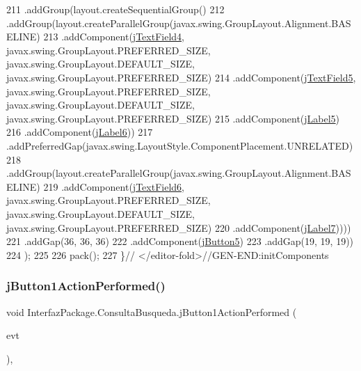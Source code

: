 \begin{DoxyCode}
211                     .addGroup(layout.createSequentialGroup()
212                         .addGroup(layout.createParallelGroup(javax.swing.GroupLayout.Alignment.BASELINE)
213                             .addComponent(\mbox{\hyperlink{class_interfaz_package_1_1_consulta_busqueda_a1955bd4179b98e109c23fb701af55b5d}{jTextField4}}, javax.swing.GroupLayout.PREFERRED\_SIZE, 
      javax.swing.GroupLayout.DEFAULT\_SIZE, javax.swing.GroupLayout.PREFERRED\_SIZE)
214                             .addComponent(\mbox{\hyperlink{class_interfaz_package_1_1_consulta_busqueda_a62b77207a9f1d648087f776c36b92c4a}{jTextField5}}, javax.swing.GroupLayout.PREFERRED\_SIZE, 
      javax.swing.GroupLayout.DEFAULT\_SIZE, javax.swing.GroupLayout.PREFERRED\_SIZE)
215                             .addComponent(\mbox{\hyperlink{class_interfaz_package_1_1_consulta_busqueda_aa93cd22be90131fea76b2a1b2f113b9b}{jLabel5}})
216                             .addComponent(\mbox{\hyperlink{class_interfaz_package_1_1_consulta_busqueda_ab5f2ed2b4cd6da7ed4e68ab08caabf65}{jLabel6}}))
217                         .addPreferredGap(javax.swing.LayoutStyle.ComponentPlacement.UNRELATED)
218                         .addGroup(layout.createParallelGroup(javax.swing.GroupLayout.Alignment.BASELINE)
219                             .addComponent(\mbox{\hyperlink{class_interfaz_package_1_1_consulta_busqueda_a98f9196a81f18bfd45672e1c4605d68a}{jTextField6}}, javax.swing.GroupLayout.PREFERRED\_SIZE, 
      javax.swing.GroupLayout.DEFAULT\_SIZE, javax.swing.GroupLayout.PREFERRED\_SIZE)
220                             .addComponent(\mbox{\hyperlink{class_interfaz_package_1_1_consulta_busqueda_a999fbcac6f0a6a7bfc57c17612ea2605}{jLabel7}}))))
221                 .addGap(36, 36, 36)
222                 .addComponent(\mbox{\hyperlink{class_interfaz_package_1_1_consulta_busqueda_a92a758e63cc825dd1292869d625115dd}{jButton5}})
223                 .addGap(19, 19, 19))
224         );
225 
226         pack();
227     \}\textcolor{comment}{// </editor-fold>//GEN-END:initComponents}
\end{DoxyCode}
\mbox{\label{class_interfaz_package_1_1_consulta_busqueda_ab7479eeeb30a47204e0ce5435b2943f4}} 
\subsubsection{\texorpdfstring{j\+Button1\+Action\+Performed()}{jButton1ActionPerformed()}}
{\footnotesize\ttfamily void Interfaz\+Package.\+Consulta\+Busqueda.\+j\+Button1\+Action\+Performed (\begin{DoxyParamCaption}\item[{java.\+awt.\+event.\+Action\+Event}]{evt }\end{DoxyParamCaption})\hspace{0.3cm}{\ttfamily [inline]}, {\ttfamily [private]}}


